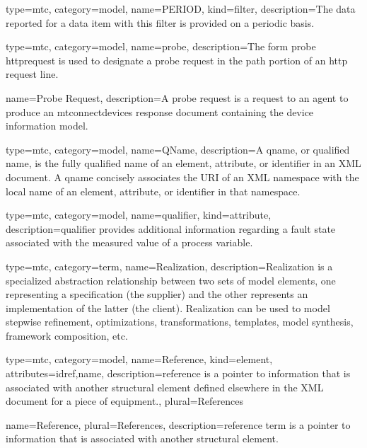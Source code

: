 {
  type=mtc,
  category=model,
  name={PERIOD},
  kind={filter},
  description={The data reported for a data item with this \gls{filter} is provided on a periodic basis.}
}



{
  type=mtc,
  category=model,
  name={probe},
  description={The form \gls{probe httprequest} is used to designate a \gls{probe request} in the path portion of an \gls{http request line}.}
}


{
  name={Probe Request},
  description={A \gls{probe request} is a \gls{request} to an \gls{agent} to produce an \gls{mtconnectdevices response document} containing the \gls{device information model}.}
}


{
  type=mtc,
  category=model,
  name={QName},
  description={A \gls{qname}, or qualified name, is the fully qualified name of an element, attribute, or identifier in an XML document. A  \gls{qname} concisely associates the URI of an XML namespace with the local name of an element, attribute, or identifier in that namespace.}
}


{
  type=mtc,
  category=model,
  name={qualifier},
  kind={attribute},
  description={\gls{qualifier} provides additional information regarding a \gls{fault state} associated with the measured value of a process variable.}
}


{
  type=mtc,
  category=term,
  name={Realization},
  description={Realization is a specialized abstraction relationship between two sets of model elements, one representing a specification (the supplier) and the other represents an implementation of the latter (the client). Realization can be used to model stepwise refinement, optimizations, transformations, templates, model synthesis, framework composition, etc.}
}


{
  type={mtc},
  category=model,
  name={Reference},
  kind={element},
  attributes={\gls{idref},\gls{name}},
  description={\gls{reference} is a pointer to information that is associated with another \gls{structural element} defined elsewhere in the XML document for a piece of equipment.},
  plural={References}
}

{
  name={Reference},
  plural={References},
  description={\gls{reference term} is a pointer to information that is associated with another \gls{structural element}.}
}

